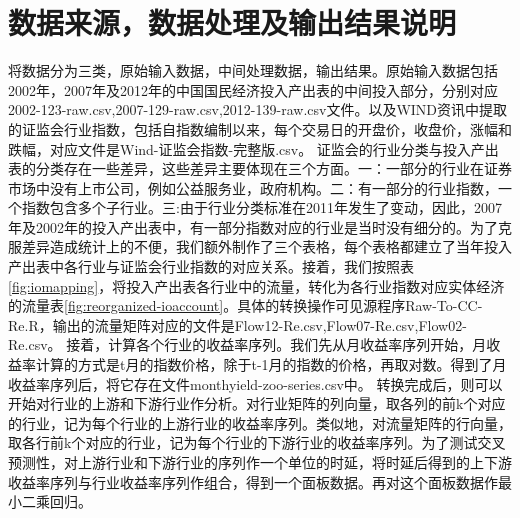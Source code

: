 \documentclass{sysuthesis}
\begin{document}
\chapter{数据来源，数据处理及输出结果说明}
将数据分为三类，原始输入数据，中间处理数据，输出结果。原始输入数据包括2002年，2007年及2012年的中国国民经济投入产出表的中间投入部分，分别对应2002-123-raw.csv,2007-129-raw.csv,2012-139-raw.csv文件。以及WIND资讯中提取的证监会行业指数，包括自指数编制以来，每个交易日的开盘价，收盘价，涨幅和跌幅，对应文件是Wind-证监会指数-完整版.csv。
证监会的行业分类与投入产出表的分类存在一些差异，这些差异主要体现在三个方面。一：一部分的行业在证券市场中没有上市公司，例如公益服务业，政府机构。二：有一部分的行业指数，一个指数包含多个子行业。三:由于行业分类标准在2011年发生了变动，因此，2007年及2002年的投入产出表中，有一部分指数对应的行业是当时没有细分的。为了克服差异造成统计上的不便，我们额外制作了三个表格，每个表格都建立了当年投入产出表中各行业与证监会行业指数的对应关系。接着，我们按照表\ref{fig:iomapping}，将投入产出表各行业中的流量，转化为各行业指数对应实体经济的流量表\ref{fig:reorganized-ioaccount}。具体的转换操作可见源程序Raw-To-CC-Re.R，输出的流量矩阵对应的文件是Flow12-Re.csv,Flow07-Re.csv,Flow02-Re.csv。
接着，计算各个行业的收益率序列。我们先从月收益率序列开始，月收益率计算的方式是t月的指数价格，除于t-1月的指数的价格，再取对数。得到了月收益率序列后，将它存在文件monthyield-zoo-series.csv中。
转换完成后，则可以开始对行业的上游和下游行业作分析。对行业矩阵的列向量，取各列的前k个对应的行业，记为每个行业的上游行业的收益率序列。类似地，对流量矩阵的行向量，取各行前k个对应的行业，记为每个行业的下游行业的收益率序列。为了测试交叉预测性，对上游行业和下游行业的序列作一个单位的时延，将时延后得到的上下游收益率序列与行业收益率序列作组合，得到一个面板数据。再对这个面板数据作最小二乘回归。
\end{document}
